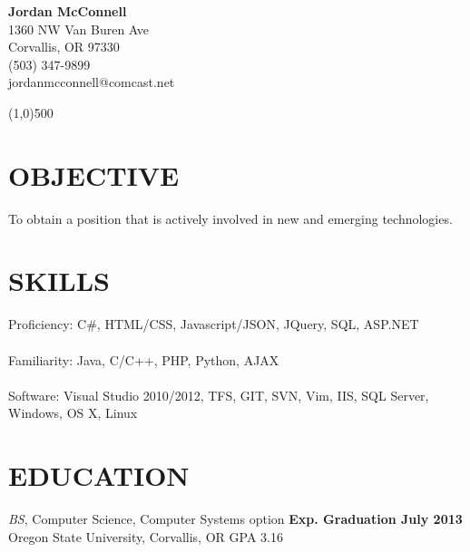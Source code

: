 \documentclass{res}
\begin{document}
\begin{resume}
\vspace{-36pt}
{\centering
{\Large \bf Jordan McConnell} \\
1360 NW Van Buren Ave \\
Corvallis, OR 97330 \\
(503) 347-9899 \\
jordanmcconnell@comcast.net
\par
}
\vspace{-12pt}
\begin{center}
\line(1,0){500}
\end{center}

\section{OBJECTIVE}
\vspace{8pt} %
To obtain a position that is actively involved in new and emerging technologies.
\vspace{0.2in}
\section{SKILLS}
\vspace{8pt}
Proficiency: C\#, HTML/CSS, Javascript/JSON, JQuery, SQL, ASP.NET
\\
\\
Familiarity: Java, C/C++, PHP, Python, AJAX
\\
\\
Software: Visual Studio 2010/2012, TFS, GIT, SVN, Vim, IIS, SQL Server, Windows, OS X, Linux

\vspace{0.2in}
\section{EDUCATION}
\vspace{8pt}
{\sl BS}, Computer Science, Computer Systems option \hfill{\bf Exp. Graduation July 2013}\\
Oregon State University, Corvallis, OR \hfill GPA 3.16 \\


\end{resume}
\end{document}
